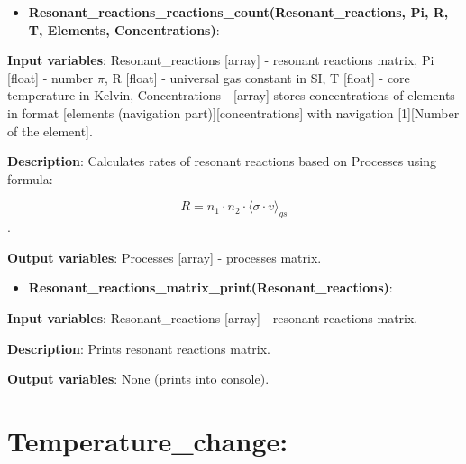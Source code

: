 \documentclass[a4paper,12pt]{article}
\newcommand{\namefunction}[4]{
  \begin{itemize}
    \item \textbf{#1}:
  \end{itemize}
  
  \textbf{Input variables}: #2.
  
  \textbf{Description}: #3.
  
  \textbf{Output variables}: #4.
}
\begin{document}
\vspace{1em}

\namefunction{Resonant\_reactions\_reactions\_count(Resonant\_reactions, Pi, R, T, Elements, Concentrations)}{Resonant\_reactions [array] - resonant reactions matrix, Pi [float] - number $\pi$, R [float] - universal gas constant in SI, T [float] - core temperature in Kelvin, Concentrations - [array] stores concentrations of elements in format [elements (navigation part)][concentrations] with navigation [1][Number of the element]}{Calculates rates of resonant reactions based on Processes using formula:

\[R = n_1 \cdot n_2 \cdot \langle \sigma \cdot v \rangle_{gs}\]}{Processes [array] - processes matrix}

\vspace{1em}

\namefunction{Resonant\_reactions\_matrix\_print(Resonant\_reactions)}{Resonant\_reactions [array] - resonant reactions matrix}{Prints resonant reactions matrix}{None (prints into console)}

\section{Temperature\_change:}

\vspace{1em}
\end{document}
